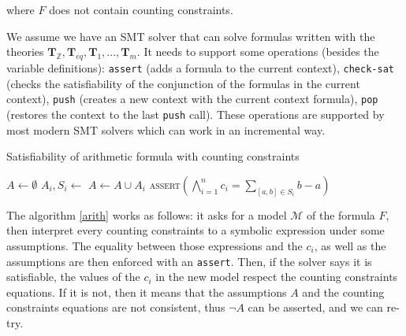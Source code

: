\documentclass[]{article}
\begin{document}
where $F$ does not contain counting constraints.

We assume we have an SMT solver that can solve formulas written with the
theories
$\mathbf{T}_\mathbb{Z}, \mathbf{T}_{eq}, \mathbf{T}_1, \ldots, \mathbf{T}_m$.
It needs to support some operations (besides the variable definitions):
\texttt{assert} (adds a formula to the current context),
\texttt{check-sat} (checks the satisfiability of the conjunction of the
formulas in the current context), \texttt{push} (creates a new context
with the current context formula), \texttt{pop} (restores the context to
the last \texttt{push} call). These operations are supported by most
modern SMT solvers which can work in an incremental way.

\begin{algorithm}
\caption{Satisfiability of arithmetic formula with counting constraints}\label{arith}
\begin{algorithmic}[1]
\State {}
    \State {}
    \State $A \gets \emptyset$
        \State $A_i, S_i \gets $ 
        \State $A \gets A \cup A_i$
            \State {}
            \State {}
        \EndIf
    \EndFor
    \State {}
    \State \textsc{assert}$\left(\bigwedge\limits_{i=1}^n c_i = \sum\limits_{[a, b] \in S_i} b - a\right)$
        \State {}
        \State {}
    \EndIf
    \State {}
    \State {}
\EndWhile
\State {}
\end{algorithmic}
\label{arith}
\end{algorithm}

The algorithm \ref{arith} works as follows: it asks for a model
$\mathcal{M}$ of the formula $F$, then interpret every counting
constraints to a symbolic expression under some assumptions. The
equality between those expressions and the $c_i$, as well as the
assumptions are then enforced with an \texttt{assert}. Then, if the
solver says it is satisfiable, the values of the $c_i$ in the new
model respect the counting constraints equations. If it is not, then it
means that the assumptions $A$ and the counting constraints equations
are not consistent, thus $\lnot A$ can be asserted, and we can re-try.
\end{document}

